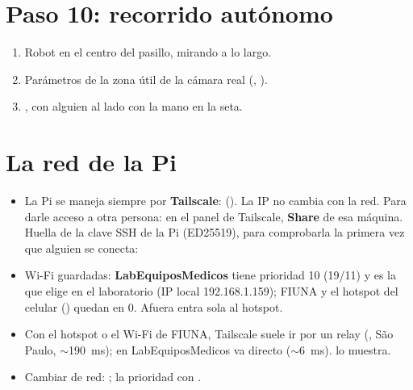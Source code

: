 \section{Paso 10: recorrido autónomo}
\begin{enumerate}
  \item Robot en el centro del pasillo, mirando a lo largo.
  \item Parámetros de la zona útil de la cámara real (, ).
  \item {}, con alguien al lado con la mano en la seta.
\end{enumerate}

\section{La red de la Pi}\label{sec:red-pi}

\begin{itemize}
  \item La Pi se maneja siempre por \textbf{Tailscale}:  (). La IP no
        cambia con la red. Para darle acceso a otra persona: en el panel de Tailscale, \textbf{Share} de esa máquina.
        Huella de la clave SSH de la Pi (ED25519), para comprobarla la primera vez que alguien se conecta:\\
  \item Wi-Fi guardadas: \textbf{LabEquiposMedicos} tiene prioridad 10 (19/11) y es la que elige en el laboratorio
        (IP local 192.168.1.159); FIUNA y el hotspot del celular () quedan en 0. Afuera entra
        sola al hotspot.
  \item Con el hotspot o el Wi-Fi de FIUNA, Tailscale suele ir por un relay (, São Paulo, $\sim$190~ms); en
        LabEquiposMedicos va directo ($\sim$6~ms).  lo muestra.
  \item Cambiar de red: ; la prioridad con
        .
\end{itemize}
